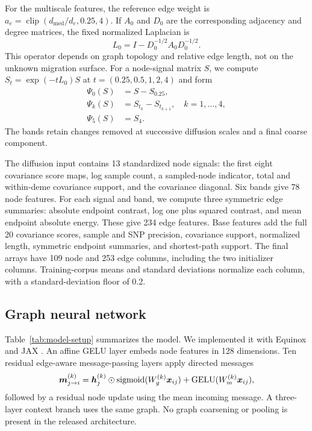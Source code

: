 For the multiscale features, the reference edge weight is
$a_e=\operatorname{clip}(d_{\mathrm{med}}/d_e,0.25,4)$. If $A_0$ and $D_0$
are the corresponding adjacency and degree matrices, the fixed normalized
Laplacian is
\begin{equation}
    L_0=I-D_0^{-1/2}A_0D_0^{-1/2}.
\end{equation}
This operator depends on graph topology and relative edge length, not on the
unknown migration surface. For a node-signal matrix $S$, we compute
$S_t=\exp(-tL_0)S$ at $t=(0.25,0.5,1,2,4)$ and form
\begin{equation}
 \begin{split}
    \Psi_0(S)&=S-S_{0.25},\\
    \Psi_k(S)&=S_{t_k}-S_{t_{k+1}},\quad k=1,\ldots,4,\\
    \Psi_5(S)&=S_{4}.
 \end{split}
 \label{eq:diffusion-bands}
\end{equation}
The bands retain changes removed at successive diffusion scales and a final
coarse component.

The diffusion input contains 13 standardized node signals: the first eight
covariance score maps, log sample count, a sampled-node indicator, total and
within-deme covariance support, and the covariance diagonal. Six bands give
78 node features. For each signal and band, we compute three symmetric edge
summaries: absolute endpoint contrast, log one plus squared contrast, and mean
endpoint absolute energy. These give 234 edge features. Base features add the
full 20 covariance scores, sample and SNP precision, covariance support,
normalized length, symmetric endpoint summaries, and shortest-path support.
The final arrays have 109 node and 253 edge columns, including the two
initializer columns. Training-corpus means and standard deviations normalize
each column, with a standard-deviation floor of 0.2.

\subsection{Graph neural network}

Table~\ref{tab:model-setup} summarizes the model. We implemented it with
Equinox and JAX \citep{jax2018,deepmind2020jax,equinox2021}. An affine GELU
layer embeds node features in 128 dimensions. Ten residual edge-aware
message-passing layers apply directed messages
\begin{equation}
    \boldsymbol{m}_{j\rightarrow i}^{(k)}
    =
    \boldsymbol{h}_j^{(k)}\odot
    \operatorname{sigmoid}(W_g^{(k)}\boldsymbol{x}_{ij})
    +\operatorname{GELU}(W_m^{(k)}\boldsymbol{x}_{ij}),
    \label{eq:edge-message}
\end{equation}
followed by a residual node update using the mean incoming message. A
three-layer context branch uses the same graph. No graph coarsening or pooling
is present in the released architecture.

